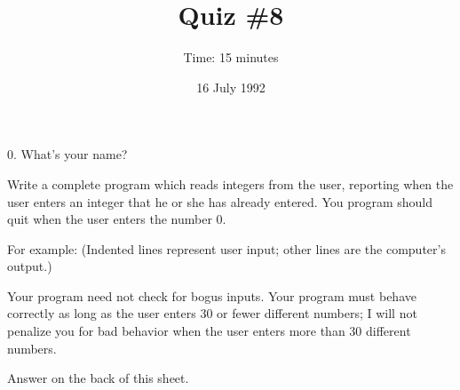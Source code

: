



\topmargin -0.5in
\textheight 9in

\title{Quiz \#8}
\date{16 July 1992}
\author{Time: 15 minutes}


\maketitle

0. What's your name?

\vspace{.5in}

Write a complete program which reads integers from the user, reporting
when the user enters an integer that he or she has already entered.
You program should quit when the user enters the number 0.

For example: (Indented lines represent user input; other lines are the
computer's output.)

\begin{flushleft}
\verb% Please enter a sequence of numbers, 0 to quit.% \\*
\verb%        23% \\*
\verb%        119% \\*
\verb%        5% \\*
\verb%        119% \\*
\verb% You entered that number already.% \\*
\verb%        17% \\*
\verb%        1776% \\*
\verb%        119% \\*
\verb% You entered that number already.% \\*
\verb%        23% \\*
\verb% You entered that number already.% \\*
\verb%        2001% \\*
\verb%        0% \\*
\verb% Done.% \\*
\end{flushleft}

Your program need not check for bogus inputs.  Your program must behave
correctly as long as the user enters 30 or fewer different numbers; I
will not penalize you for bad behavior when the user enters more than 30
different numbers.  

Answer on the back of this sheet.


